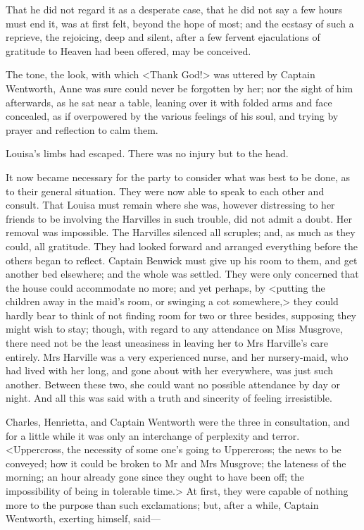 That he did not regard it as a desperate case, that he did not say a few hours must end it, was at first felt, beyond the hope of most; and the ecstasy of such a reprieve, the rejoicing, deep and silent, after a few fervent ejaculations of gratitude to Heaven had been offered, may be conceived.

The tone, the look, with which <Thank God!> was uttered by Captain Wentworth, Anne was sure could never be forgotten by her; nor the sight of him afterwards, as he sat near a table, leaning over it with folded arms and face concealed, as if overpowered by the various feelings of his soul, and trying by prayer and reflection to calm them.

Louisa's limbs had escaped. There was no injury but to the head.

It now became necessary for the party to consider what was best to be done, as to their general situation. They were now able to speak to each other and consult. That Louisa must remain where she was, however distressing to her friends to be involving the Harvilles in such trouble, did not admit a doubt. Her removal was impossible. The Harvilles silenced all scruples; and, as much as they could, all gratitude. They had looked forward and arranged everything before the others began to reflect. Captain Benwick must give up his room to them, and get another bed elsewhere; and the whole was settled. They were only concerned that the house could accommodate no more; and yet perhaps, by <putting the children away in the maid's room, or swinging a cot somewhere,> they could hardly bear to think of not finding room for two or three besides, supposing they might wish to stay; though, with regard to any attendance on Miss Musgrove, there need not be the least uneasiness in leaving her to Mrs Harville's care entirely. Mrs Harville was a very experienced nurse, and her nursery-maid, who had lived with her long, and gone about with her everywhere, was just such another. Between these two, she could want no possible attendance by day or night. And all this was said with a truth and sincerity of feeling irresistible.

Charles, Henrietta, and Captain Wentworth were the three in consultation, and for a little while it was only an interchange of perplexity and terror. <Uppercross, the necessity of some one's going to Uppercross; the news to be conveyed; how it could be broken to Mr and Mrs Musgrove; the lateness of the morning; an hour already gone since they ought to have been off; the impossibility of being in tolerable time.> At first, they were capable of nothing more to the purpose than such exclamations; but, after a while, Captain Wentworth, exerting himself, said—

